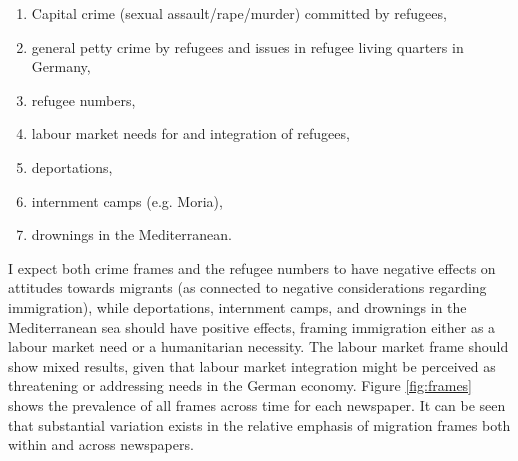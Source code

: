 \documentclass{article}
\begin{document}
\begin{enumerate}
    \item Capital crime (sexual assault/rape/murder) committed by refugees, 
    \item general petty crime by refugees and issues in refugee living quarters in Germany,
    \item refugee numbers,
    \item labour market needs for and integration of refugees,
    \item deportations,
    \item internment camps (e.g. Moria),
    \item drownings in the Mediterranean.
\end{enumerate}

I expect both crime frames and the refugee numbers to have negative effects on attitudes towards migrants (as connected to negative considerations regarding immigration), while deportations, internment camps, and drownings in the Mediterranean sea should have positive effects, framing immigration either as a labour market need or a humanitarian necessity. The labour market frame should show mixed results, given that labour market integration might be perceived as threatening or addressing needs in the German economy. Figure \ref{fig:frames} shows the prevalence of all frames across time for each newspaper. It can be seen that substantial variation exists in the relative emphasis of migration frames both within and across newspapers.
\end{document}
